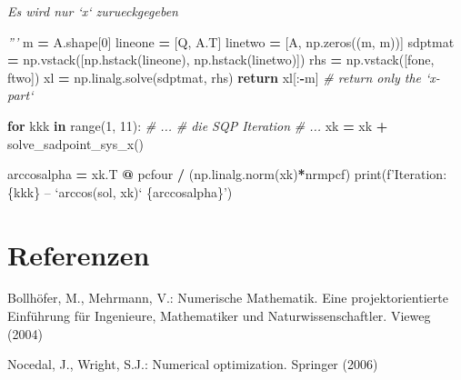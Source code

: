 \documentclass[]{book}
\newenvironment{Shaded}{\begin{snugshade}}{\end{snugshade}}
\newcommand{\BuiltInTok}[1]{#1}
\newcommand{\CommentTok}[1]{\textcolor[rgb]{0.56,0.35,0.01}{\textit{#1}}}
\newcommand{\ControlFlowTok}[1]{\textcolor[rgb]{0.13,0.29,0.53}{\textbf{#1}}}
\newcommand{\DecValTok}[1]{\textcolor[rgb]{0.00,0.00,0.81}{#1}}
\newcommand{\KeywordTok}[1]{\textcolor[rgb]{0.13,0.29,0.53}{\textbf{#1}}}
\newcommand{\NormalTok}[1]{#1}
\newcommand{\OperatorTok}[1]{\textcolor[rgb]{0.81,0.36,0.00}{\textbf{#1}}}
\newcommand{\SpecialCharTok}[1]{\textcolor[rgb]{0.00,0.00,0.00}{#1}}
\newcommand{\SpecialStringTok}[1]{\textcolor[rgb]{0.31,0.60,0.02}{#1}}
\theoremstyle{definition}
\theoremstyle{definition}
\theoremstyle{definition}
\theoremstyle{definition}
\theoremstyle{remark}
\begin{document}
\begin{Shaded}
\begin{Highlighting}[]
\CommentTok{    Es wird nur `x` zurueckgegeben}

\CommentTok{    '''}
\NormalTok{    m }\OperatorTok{=}\NormalTok{ A.shape[}\DecValTok{0}\NormalTok{]}
\NormalTok{    lineone }\OperatorTok{=}\NormalTok{ [Q, A.T]}
\NormalTok{    linetwo }\OperatorTok{=}\NormalTok{ [A, np.zeros((m, m))]}
\NormalTok{    sdptmat }\OperatorTok{=}\NormalTok{ np.vstack([np.hstack(lineone),}
\NormalTok{                         np.hstack(linetwo)])}
\NormalTok{    rhs }\OperatorTok{=}\NormalTok{ np.vstack([fone, ftwo])}
\NormalTok{    xl }\OperatorTok{=}\NormalTok{ np.linalg.solve(sdptmat, rhs)}
    \ControlFlowTok{return}\NormalTok{ xl[:}\OperatorTok{-}\NormalTok{m]  }\CommentTok{# return only the `x-part`}


\ControlFlowTok{for}\NormalTok{ kkk }\KeywordTok{in} \BuiltInTok{range}\NormalTok{(}\DecValTok{1}\NormalTok{, }\DecValTok{11}\NormalTok{):}
    \CommentTok{# ...}
    \CommentTok{# die SQP Iteration}
    \CommentTok{# ...}
\NormalTok{    xk }\OperatorTok{=}\NormalTok{ xk }\OperatorTok{+}\NormalTok{ solve_sadpoint_sys_x()}

\NormalTok{    arccosalpha }\OperatorTok{=}\NormalTok{ xk.T }\OperatorTok{@}\NormalTok{ pcfour }\OperatorTok{/}\NormalTok{ (np.linalg.norm(xk)}\OperatorTok{*}\NormalTok{nrmpcf)}
    \BuiltInTok{print}\NormalTok{(}\SpecialStringTok{f'Iteration: }\SpecialCharTok{\{}\NormalTok{kkk}\SpecialCharTok{\}}\SpecialStringTok{ -- `arccos(sol, xk)` }\SpecialCharTok{\{}\NormalTok{arccosalpha}\SpecialCharTok{\}}\SpecialStringTok{'}\NormalTok{)}
\end{Highlighting}
\end{Shaded}

\hypertarget{referenzen}{%
\chapter*{Referenzen}\label{referenzen}}

\hypertarget{refs}{}
\leavevmode\hypertarget{ref-BolM04}{}%
Bollhöfer, M., Mehrmann, V.: Numerische Mathematik. Eine projektorientierte Einführung für Ingenieure, Mathematiker und Naturwissenschaftler. Vieweg (2004)

\leavevmode\hypertarget{ref-NocW06}{}%
Nocedal, J., Wright, S.J.: Numerical optimization. Springer (2006)
\end{document}

